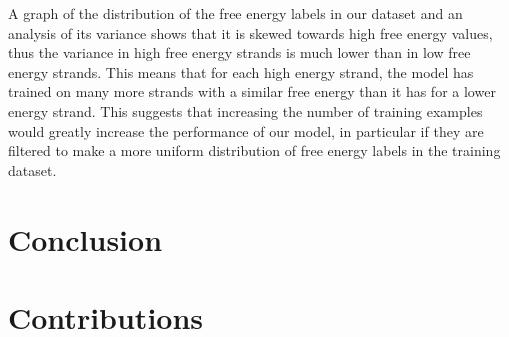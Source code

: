 \documentclass{article}
\begin{document}
A graph of the distribution of the free energy labels in our dataset and an analysis of its variance shows that it is skewed towards high free energy values, thus the variance in high free energy strands is much lower than in low free energy strands. This means that for each high energy strand, the model has trained on many more strands with a similar free energy than it has for a lower energy strand. This suggests that increasing the number of training examples would greatly increase the performance of our model, in particular if they are filtered to make a more uniform distribution of free energy labels in the training dataset.





\section{Conclusion}

\section{Contributions}



\end{document}
